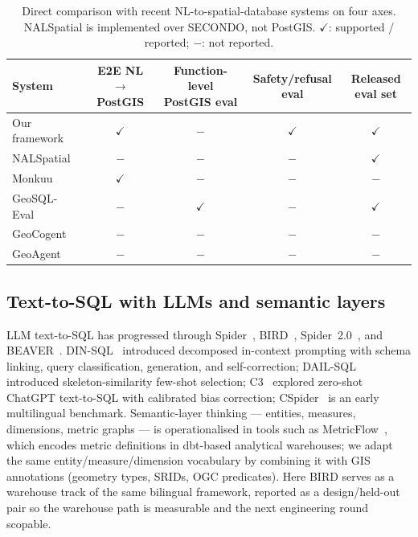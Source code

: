 \documentclass[11pt]{article}
\begin{document}
\begin{table}[t]\centering\footnotesize
\caption{Direct comparison with recent NL-to-spatial-database systems on four axes. NALSpatial is implemented over SECONDO, not PostGIS. $\checkmark$: supported / reported; $-$: not reported.}
\label{tab:related-comp}
\begin{tabular}{@{}lcccc@{}}
\toprule
System & E2E NL$\to$PostGIS & Function-level PostGIS eval & Safety/refusal eval & Released eval set \\
\midrule
Our framework                          & $\checkmark$ & $-$           & $\checkmark$ & $\checkmark$ \\
NALSpatial~\citep{liu2025nalspatial}    & $-$           & $-$           & $-$           & $\checkmark$ \\
Monkuu~\citep{yu2025monkuu}             & $\checkmark$ & $-$           & $-$           & $-$           \\
GeoSQL-Eval~\citep{hou2026geosql}       & $-$           & $\checkmark$ & $-$           & $\checkmark$ \\
GeoCogent~\citep{houcoding2025}         & $-$           & $-$           & $-$           & $-$           \\
GeoAgent~\citep{lin2026geoagent}        & $-$           & $-$           & $-$           & $-$           \\
\bottomrule
\end{tabular}
\end{table}

\subsection{Text-to-SQL with LLMs and semantic layers}

LLM text-to-SQL has progressed through Spider~\citep{yu2018spider,rajkumar2022evaluating}, BIRD~\citep{li2023bird}, Spider~2.0~\citep{lei2025spider2}, and BEAVER~\citep{chen2024beaver}. DIN-SQL~\citep{pourreza2023dinsql} introduced decomposed in-context prompting with schema linking, query classification, generation, and self-correction; DAIL-SQL~\citep{gao2024dail} introduced skeleton-similarity few-shot selection; C3~\citep{dong2023c3} explored zero-shot ChatGPT text-to-SQL with calibrated bias correction; CSpider~\citep{min2019cspider} is an early multilingual benchmark. Semantic-layer thinking --- entities, measures, dimensions, metric graphs --- is operationalised in tools such as MetricFlow~\citep{metricflow}, which encodes metric definitions in dbt-based analytical warehouses; we adapt the same entity/measure/dimension vocabulary by combining it with GIS annotations (geometry types, SRIDs, OGC predicates). Here BIRD serves as a warehouse track of the same bilingual framework, reported as a design/held-out pair so the warehouse path is measurable and the next engineering round scopable.
\end{document}
